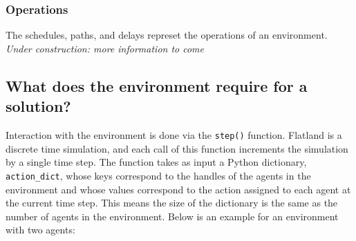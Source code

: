\subsubsection{Operations}
The schedules, paths, and delays represet the operations of an environment.  \textit{Under construction: more information to come}





\subsection{What does the environment require for a solution?}
Interaction with the environment is done via the \texttt{step()} function.  Flatland is a discrete time simulation, and each call of this function increments the simulation by a single time step.  
The function takes as input a Python dictionary, \texttt{action\_dict}, whose keys correspond to the handles of the agents in the environment and whose values correspond to the action assigned to each agent at the current time step.  
This means the size of the dictionary is the same as the number of agents in the environment.  
Below is an example for an environment with two agents:


